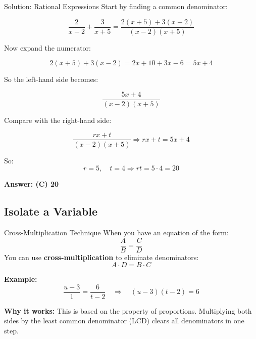\documentclass{beamer}
\begin{document}
\begin{frame}{Solution: Rational Expressions}
\small
Start by finding a common denominator:

\[
\frac{2}{x - 2} + \frac{3}{x + 5} = \frac{2(x + 5) + 3(x - 2)}{(x - 2)(x + 5)}
\]

Now expand the numerator:

\[
2(x + 5) + 3(x - 2) = 2x + 10 + 3x - 6 = 5x + 4
\]

So the left-hand side becomes:

\[
\frac{5x + 4}{(x - 2)(x + 5)}
\]

Compare with the right-hand side:

\[
\frac{rx + t}{(x - 2)(x + 5)} \Rightarrow rx + t = 5x + 4
\]

So:
\[
r = 5,\quad t = 4
\Rightarrow rt = 5 \cdot 4 = \boxed{20}
\]

\textbf{Answer: (C) 20}
\end{frame}


\begin{frame}
\section{Isolate a Variable}
\end{frame}


\begin{frame}{Cross-Multiplication Technique}
\small
When you have an equation of the form:
\[
\frac{A}{B} = \frac{C}{D}
\]
You can use \textbf{cross-multiplication} to eliminate denominators:
\[
A \cdot D = B \cdot C
\]

\vspace{0.3cm}
\textbf{Example:}
\[
\frac{u - 3}{1} = \frac{6}{t - 2} \quad \Rightarrow \quad (u - 3)(t - 2) = 6
\]

\vspace{0.3cm}
\textbf{Why it works:} This is based on the property of proportions. Multiplying both sides by the least common denominator (LCD) clears all denominators in one step.
\end{frame}
\end{document}
